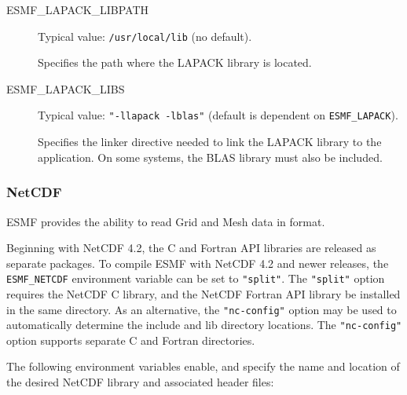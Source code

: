 \begin{description}
\item[ESMF\_LAPACK\_LIBPATH] Typical value: {\tt /usr/local/lib} (no default).

Specifies the path where the LAPACK library is located.

\item[ESMF\_LAPACK\_LIBS] Typical value: {\tt "-llapack -lblas"}
(default is dependent on {\tt ESMF\_LAPACK}).

Specifies the linker directive needed to link the LAPACK library to
the application.  On some systems, the BLAS library must also be included.
\end{description}


\subsubsection{NetCDF}
\label{sec:netcdf}
ESMF provides the ability to read Grid and Mesh data in
 format.

Beginning with NetCDF 4.2, the C and Fortran API libraries are released as separate packages.
To compile ESMF with NetCDF 4.2 and newer releases, the {\tt ESMF\_NETCDF} environment variable
can be set to {\tt "split"}.  The {\tt "split"} option requires the NetCDF C library,
and the NetCDF Fortran API library be installed in the same directory.  As an alternative,
the {\tt "nc-config"} option may be used to automatically determine the include and lib directory
locations.  The {\tt "nc-config"} option supports separate C and Fortran directories.


The following environment variables enable, and specify the name and location
of the desired NetCDF library and associated header files:

